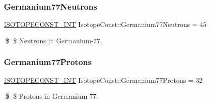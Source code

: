 \subsubsection{\texorpdfstring{Germanium77\+Neutrons}{Germanium77Neutrons}}
{\footnotesize\ttfamily \mbox{\hyperlink{group___isotope_const-_macros_ga5f18360b3e99483a35c32d789e62621c}{I\+S\+O\+T\+O\+P\+E\+C\+O\+N\+S\+T\+\_\+\+I\+NT}} Isotope\+Const\+::\+Germanium77\+Neutrons = 45}

\$ \$ Neutrons in Germanium-\/77. \mbox{\label{group___isotope_const-_germanium-_ge77_ga46d856476302fe87d7235c4ce7920c14}} 
\subsubsection{\texorpdfstring{Germanium77\+Protons}{Germanium77Protons}}
{\footnotesize\ttfamily \mbox{\hyperlink{group___isotope_const-_macros_ga5f18360b3e99483a35c32d789e62621c}{I\+S\+O\+T\+O\+P\+E\+C\+O\+N\+S\+T\+\_\+\+I\+NT}} Isotope\+Const\+::\+Germanium77\+Protons = 32}

\$ \$ Protons in Germanium-\/77. 